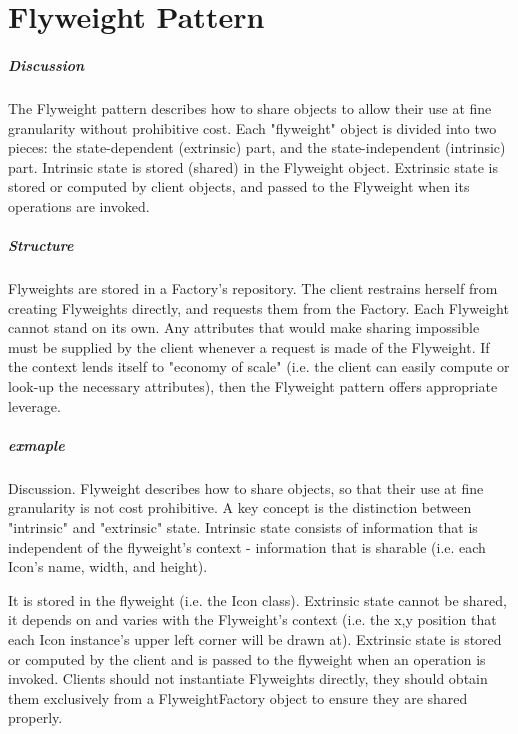 \documentclass{book}
\begin{document}
\chapter{Flyweight Pattern}\label{FlyweightPattern}
\paragraph{Discussion}
The Flyweight pattern describes how to share objects to allow their use at fine granularity without prohibitive cost.
Each "flyweight" object is divided into two pieces: the state-dependent (extrinsic) part, and the state-independent (intrinsic) part.
Intrinsic state is stored (shared) in the Flyweight object.
Extrinsic state is stored or computed by client objects, and passed to the Flyweight when its operations are invoked.
\paragraph{Structure}
Flyweights are stored in a Factory's repository.
The client restrains herself from creating Flyweights directly, and requests them from the Factory.
Each Flyweight cannot stand on its own. Any attributes that would make sharing impossible must be supplied by the client whenever a request is made of the Flyweight.
If the context lends itself to "economy of scale" (i.e. the client can easily compute or look-up the necessary attributes), then the Flyweight pattern offers appropriate leverage.

\paragraph{exmaple}

Discussion. Flyweight describes how to share objects, so that their use at fine granularity is not cost prohibitive.
A key concept is the distinction between "intrinsic" and "extrinsic" state.
Intrinsic state consists of information that is independent of the flyweight's context - information that is sharable (i.e. each Icon's name, width, and height).

It is stored in the flyweight (i.e. the Icon class).
Extrinsic state cannot be shared, it depends on and varies with the Flyweight's context (i.e. the x,y position that each Icon instance's upper left corner will be drawn at).
Extrinsic state is stored or computed by the client and is passed to the flyweight when an operation is invoked.
Clients should not instantiate Flyweights directly, they should obtain them exclusively from a FlyweightFactory object to ensure they are shared properly.
\end{document}

